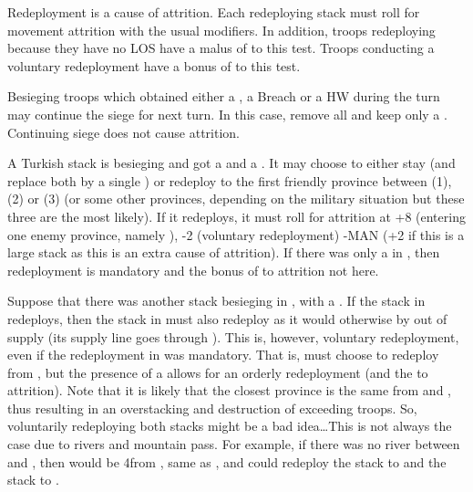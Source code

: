 \bparag Redeployment is a cause of attrition. Each redeploying stack must roll
for movement attrition with the usual modifiers.
\bparag In addition, troops redeploying because they have no LOS have a malus
of  to this test.
\bparag Troops conducting a voluntary redeployment have a bonus of 
to this test.

\bparag Besieging troops which obtained either a \USURE\Faceplus, a Breach or
a HW during the turn may continue the siege for next turn.
\bparag In this case, remove all \USURE and keep only a \USURE\Facemoins.
\bparag Continuing siege does not cause attrition.

\begin{exemple}
  A Turkish stack is besieging \provinceBanat and got a \USURE\Faceplus and a
  \USURE\Facemoins. It may choose to either stay (and replace both \USURE by a
  single \USURE\Facemoins) or redeploy to the first friendly province between
  \provinceValahia (1\MP), \provinceSerbia (2\MP) or \provinceBulgaristan
  (3\MP) (or some other provinces, depending on the military situation but
  these three are the most likely). If it redeploys, it must roll for
  attrition at +8 (entering one enemy province, namely \provinceBanat), -2
  (voluntary redeployment) -MAN (+2 if this is a large stack as this is an
  extra cause of attrition). If there was only a \USURE\Facemoins in
  \provinceBanat, then redeployment is mandatory and the bonus of 
  to attrition not here.
\end{exemple}

\begin{exemple}
  Suppose that there was another stack besieging \villeBuda in
  \provinceMagyarorszag, with a \USURE\Faceplus. If the stack in
  \provinceBanat redeploys, then the stack in \provinceMagyarorszag must also
  redeploy as it would otherwise by out of supply (its supply line goes
  through \provinceBanat). This is, however, voluntary redeployment, even if
  the redeployment in \provinceBanat was mandatory. That is, \TUR must choose
  to redeploy from \provinceMagyarorszag, but the presence of a
  \USURE\Faceplus allows for an orderly redeployment (and the  to
  attrition). Note that it is likely that the closest province is the same
  from \provinceBanat and \provinceMagyarorszag, thus resulting in an
  overstacking and destruction of exceeding troops. So, voluntarily
  redeploying both stacks might be a bad idea\ldots This is not always the
  case due to rivers and mountain pass. For example, if there was no river
  between \provinceMagyarorszag and \provinceCroatie, then \provinceSerbia
  would be 4\MP from \provinceMagyarorszag, same as \provinceValahia, and \TUR
  could redeploy the \provinceBanat stack to \provinceValahia and the
  \provinceMagyarorszag stack to \provinceSerbia.
\end{exemple}

